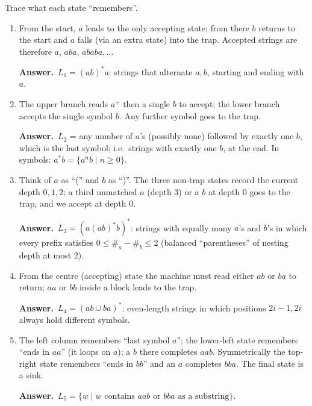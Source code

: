 \documentclass[11pt,a4paper]{article}
\newcommand{\ans}[1]{\par\smallskip\noindent\colorbox{mist}{\parbox{\dimexpr\linewidth-2\fboxsep}{\sffamily\small\textbf{\color{teal}Answer.}\ \color{ink}#1}}\par}
\begin{document}
\begin{solution}
Trace what each state ``remembers''.
\begin{enumerate}
\item From the start, $a$ leads to the only accepting state; from there $b$ returns to the start and $a$ falls (via an extra state) into the trap. Accepted strings are therefore $a$, $aba$, $ababa,\dots$
\ans{$L_1=(ab)^*a$: strings that alternate $a,b$, starting and ending with $a$.}
\item The upper branch reads $a^+$ then a single $b$ to accept; the lower branch accepts the single symbol $b$. Any further symbol goes to the trap.
\ans{$L_2$ = any number of $a$'s (possibly none) followed by exactly one $b$, which is the last symbol; i.e.\ strings with exactly one $b$, at the end. In symbols: $a^*b=\{a^nb\mid n\ge 0\}$.}
\item Think of $a$ as ``('' and $b$ as ``)''. The three non-trap states record the current depth $0,1,2$; a third unmatched $a$ (depth 3) or a $b$ at depth 0 goes to the trap, and we accept at depth 0.
\ans{$L_3=(a(ab)^*b)^*$: strings with equally many $a$'s and $b$'s in which every prefix satisfies $0\le \#_a-\#_b\le 2$ (balanced ``parentheses'' of nesting depth at most 2).}
\item From the centre (accepting) state the machine must read either $ab$ or $ba$ to return; $aa$ or $bb$ inside a block leads to the trap.
\ans{$L_4=(ab\cup ba)^*$: even-length strings in which positions $2i-1,2i$ always hold different symbols.}
\item The left column remembers ``last symbol $a$''; the lower-left state remembers ``ends in $aa$'' (it loops on $a$); a $b$ there completes $aab$. Symmetrically the top-right state remembers ``ends in $bb$'' and an $a$ completes $bba$. The final state is a sink.
\ans{$L_5=\{w\mid w \text{ contains } aab \text{ or } bba \text{ as a substring}\}$.}
\end{enumerate}
\end{solution}
\end{document}
